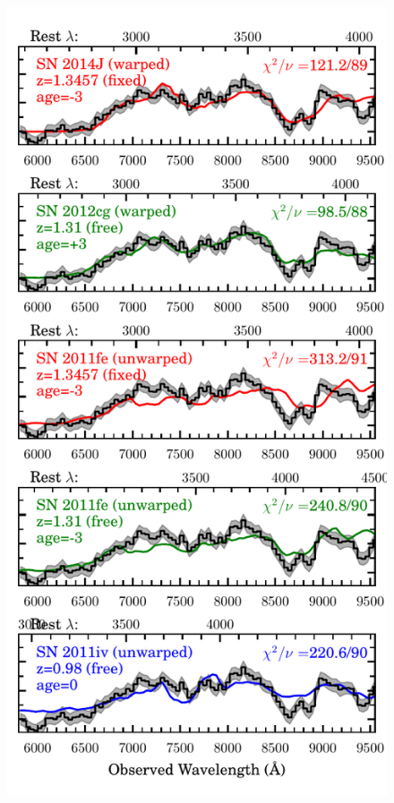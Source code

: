 \begin{figure}
\begin{center}
\includegraphics[width=\columnwidth]{FIG/specfit}
\caption{  \label{fig:SpecFit}
}
\end{center}
\end{figure}
